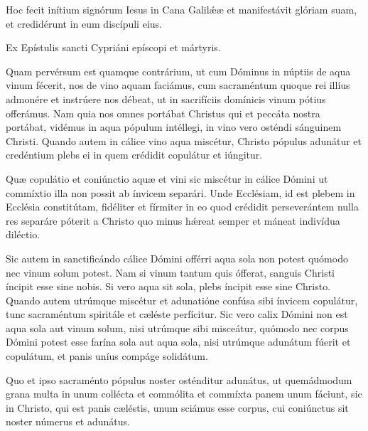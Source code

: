 {\noindent Hoc fecit inítium signórum Iesus in Cana Galilǽæ et manifestávit glóriam suam, et credidérunt in eum discípuli eius.


\noindent Ex Epístulis sancti Cypriáni epíscopi et mártyris.

\noindent Quam pervérsum est quamque contrárium, ut cum Dóminus in núptiis de aqua vinum fécerit, nos de vino aquam faciámus, cum sacraméntum quoque rei illíus admonére et instrúere nos débeat, ut in sacrifíciis domínicis vinum pótius offerámus. Nam quia nos omnes portábat Christus qui et peccáta nostra portábat, vidémus in aqua pópulum intéllegi, in vino vero osténdi sánguinem Christi. Quando autem in cálice vino aqua miscétur, Christo pópulus adunátur et credéntium plebs ei in quem crédidit copulátur et iúngitur.

\noindent Quæ copulátio et coniúnctio aquæ et vini sic miscétur in cálice Dómini ut commíxtio illa non possit ab ínvicem separári. Unde Ecclésiam, id est plebem in Ecclésia constitútam, fidéliter et fírmiter in eo quod crédidit perseverántem nulla res separáre póterit a Christo quo minus hǽreat semper et máneat indivídua diléctio.

\noindent Sic autem in sanctificándo cálice Dómini offérri aqua sola non potest quómodo nec vinum solum potest. Nam si vinum tantum quis ófferat, sanguis Christi íncipit esse sine nobis. Si vero aqua sit sola, plebs íncipit esse sine Christo. Quando autem utrúmque miscétur et adunatióne confúsa sibi ínvicem copulátur, tunc sacraméntum spiritále et cæléste perfícitur. Sic vero calix Dómini non est aqua sola aut vinum solum, nisi utrúmque sibi misceátur, quómodo nec corpus Dómini potest esse farína sola aut aqua sola, nisi utrúmque adunátum fúerit et copulátum, et panis uníus compáge solidátum.

\noindent Quo et ipso sacraménto pópulus noster osténditur adunátus, ut quemádmodum grana multa in unum collécta et commólita et commíxta panem unum fáciunt, sic in Christo, qui est panis cæléstis, unum sciámus esse corpus, cui coniúnctus sit noster númerus et adunátus.

\vfill
\pagebreak

 

\vspace{-5mm}


\vfill
\pagebreak
}
